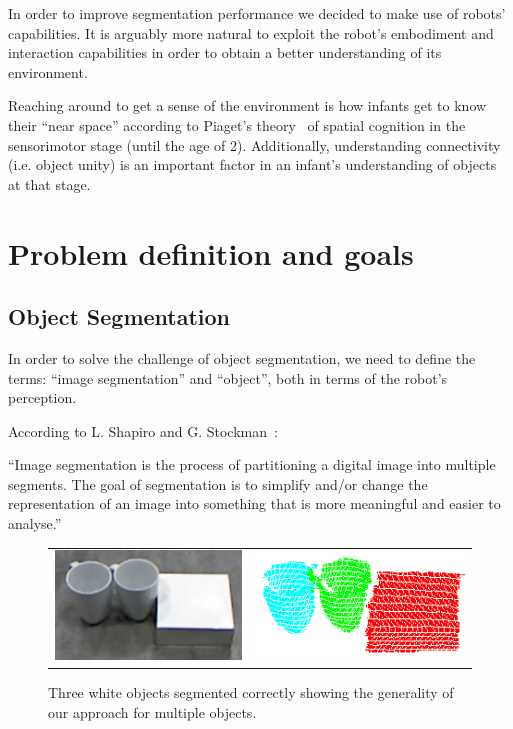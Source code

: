 In order to improve segmentation performance we decided to make use of robots'
capabilities. It is arguably more natural to exploit the robot's embodiment
and interaction capabilities in order to obtain a better understanding of its environment.

Reaching around to get a sense of the environment is how infants get to know their
``near space'' according to Piaget's theory~\cite{infants} of spatial cognition in the sensorimotor stage 
(until the age of 2). Additionally, understanding connectivity (i.e. object unity) is an important factor in an infant's understanding of objects at that stage.











\section{Problem definition and goals}

\subsection{Object Segmentation} 

In order to solve the challenge of object segmentation, we need to define the terms: ``image segmentation'' and ``object'', both in terms of the robot's perception. 


According to L. Shapiro and G. Stockman~\cite{shapiro2001computer}:

\noindent ``Image segmentation is the process of partitioning a digital image into multiple segments. The goal of segmentation is to simplify and/or change the representation of an image into something that is more meaningful and easier to analyse.''

\begin{figure}[ht]
\centering
\begin{tabular}{cccc}

\multicolumn{2}{c}{\includegraphics[width=0.45\columnwidth]{figures/3objects/after_push.jpg}}
& \multicolumn{2}{c}{\includegraphics[width=0.45\columnwidth]{figures/3objects/segmented.png}}

\end{tabular}
\caption{Three white objects segmented correctly showing the generality of our approach for multiple objects.}
\label{fig:three_objects}
\end{figure}


